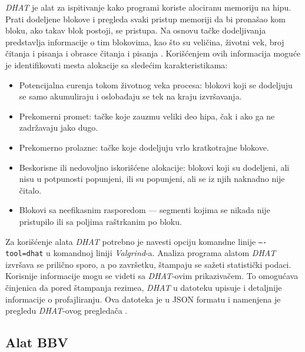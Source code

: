 \documentclass[12pt,oneside]{memoir}
\theoremstyle{plain}
\theoremstyle{definition}
\begin{document}
\textit{DHAT} je alat za ispitivanje kako programi koriste alociranu memoriju na hipu. Prati dodeljene blokove i pregleda svaki pristup memoriji da bi pronašao kom bloku, ako takav blok postoji, se pristupa. Na osnovu tačke dodeljivanja predstavlja informacije o tim blokovima, kao što su veličina, životni vek, broj čitanja i pisanja i obrasce čitanja i pisanja \cite{DHAT}. Korišćenjem ovih informacija moguće je identifikovati mesta alokacije sa sledećim karakteristikama:
\begin{itemize}
\item Potencijalna curenja tokom životnog veka procesa: blokovi koji se dodeljuju se samo akumuliraju i oslobađaju se tek na kraju izvršavanja.
\item Prekomerni promet: tačke koje zauzmu veliki deo hipa, čak i ako ga ne zadržavaju jako dugo.
\item Prekomerno prolazne: tačke koje dodeljuju vrlo kratkotrajne blokove.
\item Beskorisne ili nedovoljno iskorišćene alokacije: blokovi koji su dodeljeni, ali nisu u potpunosti popunjeni, ili su popunjeni, ali se iz njih naknadno nije čitalo.
\item Blokovi sa neefikasnim rasporedom --- segmenti kojima se nikada nije pristupilo ili sa poljima raštrkanim po bloku.
\end{itemize}

Za korišćenje alata \textit{ DHAT} potrebno je navesti opciju komandne linije \texttt{–-tool=dhat} u komandnoj liniji \textit{Valgrind}-a. Analiza programa alatom \textit{DHAT} izvršava se prilično sporo, a po završetku, štampaju se sažeti statistički podaci. Korisnije informacije mogu se videti sa \textit{DHAT}-ovim prikazivačem. To omogućava činjenica da pored štampanja rezimea, \textit{DHAT} u datoteku upisuje i detaljnije informacije o profajliranju. Ova datoteka je u JSON formatu i namenjena je pregledu \textit{DHAT}-ovog pregledača \cite{DHAT}. 

\subsection{Alat BBV}
\end{document}
